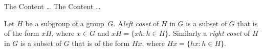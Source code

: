\documentclass{article}
\begin{document}
	\begin{mdframed}[style=mymdfStyle]
		\lipsum[1-2]
	\end{mdframed}
	
	\begin{mdfCustomed}
		The Content \ldots
		The Content \ldots
	\end{mdfCustomed}
	
	\begin{mdfthm*}
		Let $H$ be a subgroup of a group~$G$. A\emph{left coset} of $H$ in $G$ is a subset of $G$ that is of the form $xH$, where $x \in G$ and $xH = \{ xh : h \in H \}$. Similarly a \emph{right coset} of $H$ in $G$ is a subset of $G$ that is of the form $Hx$, where $Hx = \{ hx : h \in H \}$.	
	\end{mdfthm*}
	
\end{document}
